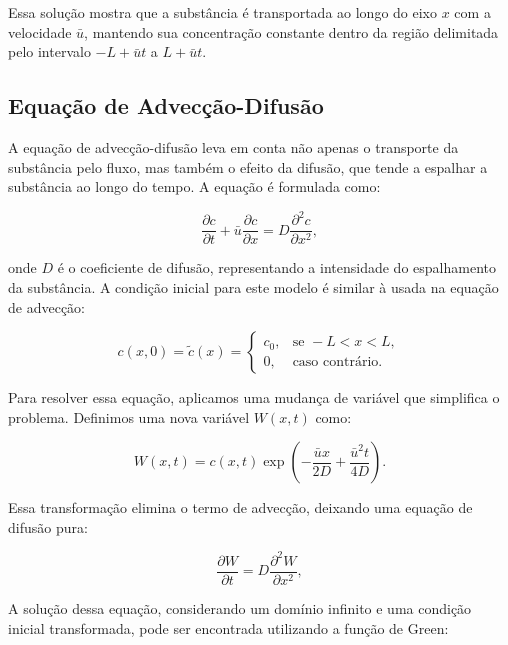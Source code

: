 Essa solução mostra que a substância é transportada ao longo do eixo \( x \) com a velocidade \( \bar{u} \), mantendo sua concentração constante dentro da região delimitada pelo intervalo \( -L + \bar{u}t \) a \( L + \bar{u}t \).

\subsection{Equação de Advecção-Difusão}

A equação de advecção-difusão leva em conta não apenas o transporte da substância pelo fluxo, mas também o efeito da difusão, que tende a espalhar a substância ao longo do tempo. A equação é formulada como:

\begin{equation}
    \frac{\partial c}{\partial t} + \bar{u} \frac{\partial c}{\partial x} = D \frac{\partial^2 c}{\partial x^2},
\end{equation}

onde \( D \) é o coeficiente de difusão, representando a intensidade do espalhamento da substância. A condição inicial para este modelo é similar à usada na equação de advecção:

\begin{equation}
    c(x, 0) = \tilde{c}(x) = \begin{cases}
    c_0, & \text{se } -L < x < L, \\
    0, & \text{caso contrário}.
    \end{cases}
\end{equation}

Para resolver essa equação, aplicamos uma mudança de variável que simplifica o problema. Definimos uma nova variável \( W(x, t) \) como:

\begin{equation}
    W(x, t) = c(x, t) \exp\left( -\frac{\bar{u} x}{2D} + \frac{\bar{u}^2 t}{4D} \right).
\end{equation}

Essa transformação elimina o termo de advecção, deixando uma equação de difusão pura:

\begin{equation}
    \frac{\partial W}{\partial t} = D \frac{\partial^2 W}{\partial x^2},
\end{equation}

A solução dessa equação, considerando um domínio infinito e uma condição inicial transformada, pode ser encontrada utilizando a função de Green:

